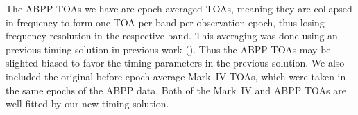 The ABPP TOAs we have are epoch-averaged TOAs, meaning they are collapsed in frequency to form one TOA per band per observation epoch, thus losing frequency resolution in the respective band. 
This averaging was done using an previous timing solution in previous work
(\citep{sns+05}). Thus the ABPP TOAs may be slighted biased to favor the
timing parameters in the previous solution. We also included the original
before-epoch-average Mark~IV TOAs, which were taken in the same epochs of the
ABPP data. Both of the Mark~IV and ABPP  TOAs are well fitted by our new
timing solution.


